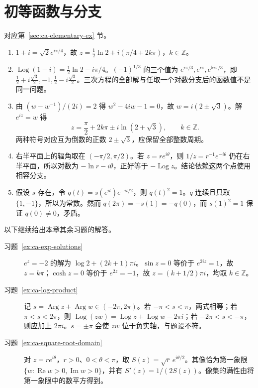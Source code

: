 \section{初等函数与分支}
对应第~\ref{sec:ca-elementary-ex} 节。
\begin{enumerate}
 \item $1+i=\sqrt2e^{i\pi/4}$，故 $z=\tfrac12\ln2+i(\pi/4+2k\pi)$，$k\in\mathbb Z$。
 \item $\operatorname{Log}(1-i)=\tfrac12\ln2-i\pi/4$。$(-1)^{1/3}$ 的三个值为 $e^{i\pi/3},e^{i\pi},e^{5i\pi/3}$，即 $\tfrac12+i\tfrac{\sqrt3}2,-1,\tfrac12-i\tfrac{\sqrt3}2$。三次方程的全部解与任取一个对数分支后的函数值不是同一问题。
 \item 由 $(w-w^{-1})/(2i)=2$ 得 $w^2-4iw-1=0$，故 $w=i(2\pm\sqrt3)$。解 $e^{iz}=w$ 得
 \[
 z=\frac\pi2+2k\pi\pm i\ln(2+\sqrt3),\qquad k\in\mathbb Z.
 \]
 两种符号对应互为倒数的正数 $2\pm\sqrt3$，应保留全部整数周期。
 \item 右半平面上的辐角取在 $(-\pi/2,\pi/2)$。若 $z=re^{i\theta}$，则 $1/z=r^{-1}e^{-i\theta}$ 仍在右半平面，所以对数为 $-\ln r-i\theta$，正好等于 $-\operatorname{Log}z$。结论依赖这两个点使用相容分支。
 \item 假设 $s$ 存在，令 $q(t)=s(e^{it})e^{-it/2}$，则 $q(t)^2=1$。$q$ 连续且只取 $\{1,-1\}$，所以为常数。然而 $q(2\pi)=-s(1)=-q(0)$，而 $s(1)^2=1$ 保证 $q(0)\ne0$，矛盾。
\end{enumerate}

以下继续给出本章其余习题的解答。
\begin{description}
 \item[习题~\ref{ex:ca-exp-solutions}]
 $e^z=-2$ 的解为 $\log2+(2k+1)\pi i$。$\sin z=0$ 等价于 $e^{2iz}=1$，故 $z=k\pi$；$\cosh z=0$ 等价于 $e^{2z}=-1$，故 $z=(k+1/2)\pi i$，均取 $k\in\mathbb{Z}$。
 \item[习题~\ref{ex:ca-log-product}]
 记 $s=\operatorname{Arg}z+\operatorname{Arg}w\in(-2\pi,2\pi)$。若 $-\pi<s<\pi$，两式相等；若 $\pi<s<2\pi$，则 $\operatorname{Log}(zw)=\operatorname{Log}z+\operatorname{Log}w-2\pi i$；若 $-2\pi<s<-\pi$，则应加上 $2\pi i$。$s=\pm\pi$ 会使 $zw$ 位于负实轴，与题设不符。
 \item[习题~\ref{ex:ca-square-root-domain}]
 对 $z=re^{i\theta}$，$r>0$、$0<\theta<\pi$，取 $S(z)=\sqrt r\,e^{i\theta/2}$。其像恰为第一象限 $\{w:\operatorname{Re}w>0,\operatorname{Im}w>0\}$，并有 $S'(z)=1/(2S(z))$。像集的满性由将第一象限中的数平方得到。
\end{description}



